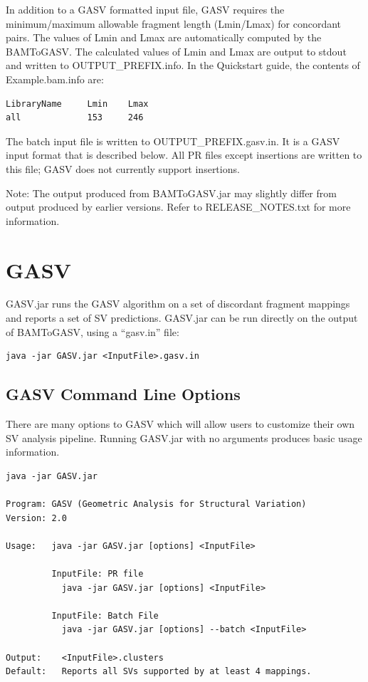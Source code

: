 \documentclass[11pt]{article}
\begin{document}
In addition to a GASV formatted input file, GASV requires the minimum/maximum
allowable fragment length (Lmin/Lmax) for concordant pairs. The values of Lmin
and Lmax are automatically computed by the BAMToGASV. The calculated values of Lmin and Lmax are output to stdout and written to OUTPUT\_PREFIX.info. In the Quickstart guide, the contents of Example.bam.info are:

{
\begin{Verbatim}[frame=single]
LibraryName     Lmin    Lmax
all             153     246
\end{Verbatim}
}

The batch input file is written to OUTPUT\_PREFIX.gasv.in.  It is a GASV input format that is described below.  All PR files except insertions are written to this file; GASV does not currently support insertions.

Note: The output produced from BAMToGASV.jar may slightly differ from output produced by earlier versions. Refer to RELEASE\_NOTES.txt for more information.

\clearpage
\section{GASV}

GASV.jar runs the GASV algorithm on a set of discordant fragment mappings and reports a set of SV predictions.  GASV.jar can be run directly on the output of BAMToGASV, using a ``gasv.in'' file:

\begin{Verbatim}[frame=single]
java -jar GASV.jar <InputFile>.gasv.in
\end{Verbatim}

\subsection{GASV Command Line Options}

There are many options to GASV which will allow users to customize their own SV analysis pipeline. Running GASV.jar with no arguments produces basic usage information.

\begin{Verbatim}[frame=single]
java -jar GASV.jar

Program: GASV (Geometric Analysis for Structural Variation)
Version: 2.0

Usage:   java -jar GASV.jar [options] <InputFile>

         InputFile: PR file
           java -jar GASV.jar [options] <InputFile>

         InputFile: Batch File
           java -jar GASV.jar [options] --batch <InputFile>

Output:    <InputFile>.clusters
Default:   Reports all SVs supported by at least 4 mappings.
\end{Verbatim}
\end{document}
